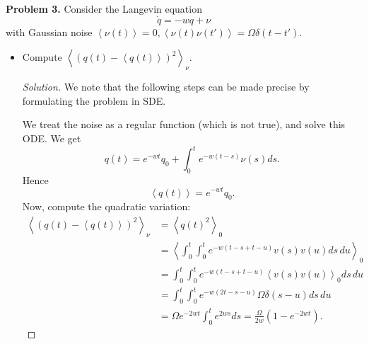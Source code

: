 \textbf{Problem 3.} Consider the Langevin equation
\[
	\dot{q} = - w q + \nu
\] 
with Gaussian noise $\left\langle \nu(t) \right\rangle = 0, \left\langle \nu(t) \nu(t') \right\rangle  = \Omega \delta(t - t')$.
\begin{itemize}
	\item Compute $\left\langle \left( q(t) - \left\langle q(t) \right\rangle  \right) ^2 \right\rangle _ \nu$.
		\begin{proof}[Solution]
			We note that the following steps can be made precise by formulating the problem in SDE.

			We treat the noise as a regular function (which is not true), and solve this ODE. We get
			\[
				q(t) = e^{ - w t} q_0 + \int _0^t e^{- w (t - s)} \nu(s) ds
			.\] 
			Hence
			\[
				\boxed{
					\left\langle q(t) \right\rangle  = e^{ - w t} q_0
				}
			.\] 
			Now, compute the quadratic variation:
			\begin{align*}
\left\langle \left( q(t) - \left\langle q(t) \right\rangle  \right) ^2 \right\rangle _ \nu
&= \left\langle q(t)^2 \right\rangle _0 \\
&= \left\langle \int _0^t \int _0^t e^{-w (t - s + t - u)} v(s) v(u) d s \, d u \right\rangle_0  \\
&=\int _0^t \int _0^t e^{-w (t - s + t - u)} \left\langle  v(s) v(u)  \right\rangle_0 d s \, d u  \\
&= \int _0^t \int _0^t e^{-w (2t - s - u)} \Omega \delta(s - u) d s \, d u \\
&= \Omega e^{- 2 w t} \int _0^t e^{2 w s} ds = \boxed{
	\frac{\Omega}{2 w} (1 - e^{- 2 w t})
}
			.\end{align*}
		\end{proof}
		

\end{itemize}
